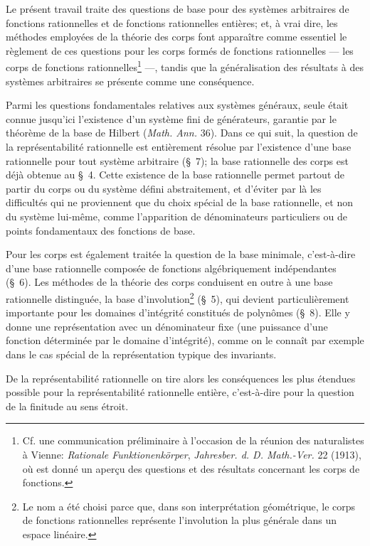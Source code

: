 \documentclass[11pt]{article}
\begin{document}
Le présent travail traite des questions de base pour des systèmes arbitraires de fonctions rationnelles et de fonctions rationnelles entières; et, à vrai dire, les méthodes employées de la théorie des corps font apparaître comme essentiel le règlement de ces questions pour les corps formés de fonctions rationnelles --- les corps de fonctions rationnelles\footnote{Cf. une communication préliminaire à l'occasion de la réunion des naturalistes à Vienne: \emph{Rationale Funktionenkörper}, \emph{Jahresber. d. D. Math.-Ver.} 22 (1913), où est donné un aperçu des questions et des résultats concernant les corps de fonctions.} ---, tandis que la généralisation des résultats à des systèmes arbitraires se présente comme une conséquence.

Parmi les questions fondamentales relatives aux systèmes généraux, seule était connue jusqu'ici l'existence d'un système fini de générateurs, garantie par le théorème de la base de Hilbert (\emph{Math. Ann.} 36). Dans ce qui suit, la question de la représentabilité rationnelle est entièrement résolue par l'existence d'une base rationnelle pour tout système arbitraire (\S\ 7); la base rationnelle des corps est déjà obtenue au \S\ 4. Cette existence de la base rationnelle permet partout de partir du corps ou du système défini abstraitement, et d'éviter par là les difficultés qui ne proviennent que du choix spécial de la base rationnelle, et non du système lui-même, comme l'apparition de dénominateurs particuliers ou de points fondamentaux des fonctions de base.

Pour les corps est également traitée la question de la base minimale, c'est-à-dire d'une base rationnelle composée de fonctions algébriquement indépendantes (\S\ 6). Les méthodes de la théorie des corps conduisent en outre à une base rationnelle distinguée, la base d'involution\footnote{Le nom a été choisi parce que, dans son interprétation géométrique, le corps de fonctions rationnelles représente l'involution la plus générale dans un espace linéaire.} (\S\ 5), qui devient particulièrement importante pour les domaines d’intégrité constitués de polynômes (\S\ 8). Elle y donne une représentation avec un dénominateur fixe (une puissance d'une fonction déterminée par le domaine d’intégrité), comme on le connaît par exemple dans le cas spécial de la représentation typique des invariants.

De la représentabilité rationnelle on tire alors les conséquences les plus étendues possible pour la représentabilité rationnelle entière, c'est-à-dire pour la question de la finitude au sens étroit.
\end{document}
